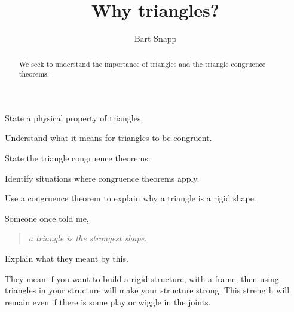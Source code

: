 \documentclass{ximera}
\title{Why triangles?}
\author{Bart Snapp}
\begin{document}
\begin{abstract}
  We seek to understand the importance of triangles and the triangle
  congruence theorems.
\end{abstract}
\maketitle


\begin{listOutcomes}
\item{State a physical property of triangles.}
\item{Understand what it means for triangles to be congruent.}
\item{State the triangle congruence theorems.}
\item{Identify situations where congruence theorems apply.}
\item{Use a congruence theorem to explain why a triangle is a rigid shape.}
\end{listOutcomes}

\mynewpage


\begin{question}
  Someone once told me,
  \begin{quote}
    \textit{a triangle is the strongest shape.}
  \end{quote}
  Explain what they meant by this.
  \begin{freeResponse}
    They mean if you want to build a rigid structure, with a frame,
    then using triangles in your structure will make your structure
    strong. This strength will remain even if there is some play
    or wiggle in the joints.
  \end{freeResponse}
\end{question}
\mynewpage
\end{document}
